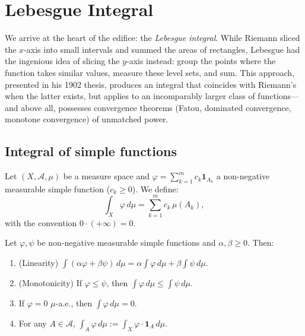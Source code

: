 \chapter{Lebesgue Integral}
\label{ch:integral}

We arrive at the heart of the edifice: the \emph{Lebesgue integral}. While Riemann sliced the $x$-axis into small intervals and summed the areas of rectangles, Lebesgue had the ingenious idea of slicing the $y$-axis instead: group the points where the function takes similar values, measure these level sets, and sum. This approach, presented in his 1902 thesis, produces an integral that coincides with Riemann's when the latter exists, but applies to an incomparably larger class of functions---and above all, possesses convergence theorems (Fatou, dominated convergence, monotone convergence) of unmatched power.

\section{Integral of simple functions}

\begin{definition}
Let $(X, \mathcal{A}, \mu)$ be a measure space and $\varphi = \sum_{k=1}^m c_k
\mathbf{1}_{A_k}$ a non-negative measurable simple function ($c_k \geq 0$). We
define:
\[
\int_X \varphi\, d\mu = \sum_{k=1}^m c_k\, \mu(A_k),
\]
with the convention $0 \cdot (+\infty) = 0$.
\end{definition}

\begin{proposition}
\label{prop:simple_integral}
Let $\varphi, \psi$ be non-negative measurable simple functions and
$\alpha, \beta \geq 0$. Then:
\begin{enumerate}
    \item (Linearity) $\int (\alpha\varphi + \beta\psi)\, d\mu =
    \alpha \int \varphi\, d\mu + \beta \int \psi\, d\mu$.
    \item (Monotonicity) If $\varphi \leq \psi$, then
    $\int \varphi\, d\mu \leq \int \psi\, d\mu$.
    \item If $\varphi = 0$ $\mu$-a.e., then $\int \varphi\, d\mu = 0$.
    \item For any $A \in \mathcal{A}$,
    $\int_A \varphi\, d\mu := \int_X \varphi \cdot \mathbf{1}_A\, d\mu$.
\end{enumerate}
\end{proposition}


